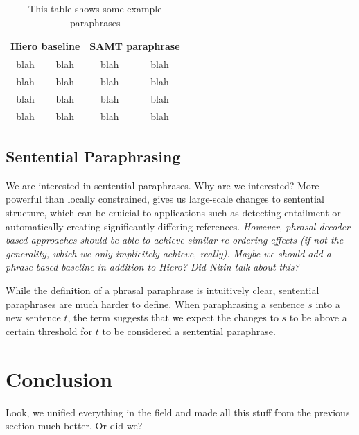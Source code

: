 \documentclass[11pt]{article}
\begin{document}
\begin{table}[ht]
\begin{center}
\begin{tabular}{|c|c|c|c|}
  \hline
  \multicolumn{2}{|c|}{Hiero baseline} & \multicolumn{2}{c|}{SAMT
    paraphrase} \\
  \hline
  blah & blah & blah & blah \\
  blah & blah & blah & blah \\
  blah & blah & blah & blah \\
  blah & blah & blah & blah \\
  \hline
\end{tabular}
\end{center}
\caption{This table shows some example paraphrases}
\end{table}


\subsection{Sentential Paraphrasing} \label{sentential_paraphrasing}

We are interested in sentential paraphrases. Why are we interested?
More powerful than locally constrained, gives us large-scale changes
to sentential structure, which can be cruicial to applications such as
detecting entailment or automatically creating significantly differing
references. \emph{However, phrasal decoder-based approaches should be
  able to achieve similar re-ordering effects (if not the generality,
  which we only implicitely achieve, really). Maybe we should add a
  phrase-based baseline in addition to Hiero? Did Nitin talk about
  this?}

While the definition of a phrasal paraphrase is intuitively clear,
sentential paraphrases are much harder to define. When paraphrasing a
sentence $s$ into a new sentence $t$, the term suggests that we expect
the changes to $s$ to be above a certain threshold for $t$ to be
considered a sentential paraphrase. 

\section{Conclusion} \label{conclusion}

Look, we unified everything in the field and made all this stuff from
the previous section much better. Or did we?




\nocite{*}
\end{document}

